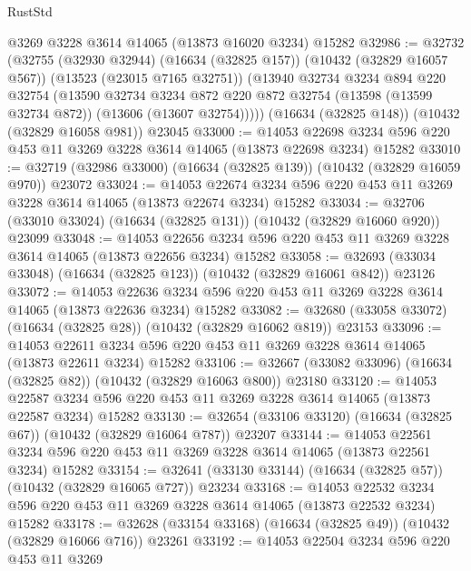\begin{lexlean}{RustStd}
\begin{coremodule}
    @3269
    @3228
    @3614
    @14065
    (@13873 @16020 @3234)
    @15282
@32986 := @32732
    (@32755
      (@32930 @32944)
      (@16634 (@32825 @157))
      (@10432 (@32829 @16057 @567))
      (@13523 (@23015 @7165 @32751))
      (@13940
        @32734
        @3234
        @894
        @220
        @32754
        (@13590
          @32734
          @3234
          @872
          @220
          @872
          @32754
          (@13598 (@13599 @32734 @872))
          (@13606 (@13607 @32754)))))
    (@16634 (@32825 @148))
    (@10432 (@32829 @16058 @981))
    @23045
@33000 := @14053
    @22698
    @3234
    @596
    @220
    @453
    @11
    @3269
    @3228
    @3614
    @14065
    (@13873 @22698 @3234)
    @15282
@33010 := @32719 (@32986 @33000) (@16634 (@32825 @139)) (@10432 (@32829 @16059 @970)) @23072
@33024 := @14053
    @22674
    @3234
    @596
    @220
    @453
    @11
    @3269
    @3228
    @3614
    @14065
    (@13873 @22674 @3234)
    @15282
@33034 := @32706 (@33010 @33024) (@16634 (@32825 @131)) (@10432 (@32829 @16060 @920)) @23099
@33048 := @14053
    @22656
    @3234
    @596
    @220
    @453
    @11
    @3269
    @3228
    @3614
    @14065
    (@13873 @22656 @3234)
    @15282
@33058 := @32693 (@33034 @33048) (@16634 (@32825 @123)) (@10432 (@32829 @16061 @842)) @23126
@33072 := @14053
    @22636
    @3234
    @596
    @220
    @453
    @11
    @3269
    @3228
    @3614
    @14065
    (@13873 @22636 @3234)
    @15282
@33082 := @32680 (@33058 @33072) (@16634 (@32825 @28)) (@10432 (@32829 @16062 @819)) @23153
@33096 := @14053
    @22611
    @3234
    @596
    @220
    @453
    @11
    @3269
    @3228
    @3614
    @14065
    (@13873 @22611 @3234)
    @15282
@33106 := @32667 (@33082 @33096) (@16634 (@32825 @82)) (@10432 (@32829 @16063 @800)) @23180
@33120 := @14053
    @22587
    @3234
    @596
    @220
    @453
    @11
    @3269
    @3228
    @3614
    @14065
    (@13873 @22587 @3234)
    @15282
@33130 := @32654 (@33106 @33120) (@16634 (@32825 @67)) (@10432 (@32829 @16064 @787)) @23207
@33144 := @14053
    @22561
    @3234
    @596
    @220
    @453
    @11
    @3269
    @3228
    @3614
    @14065
    (@13873 @22561 @3234)
    @15282
@33154 := @32641 (@33130 @33144) (@16634 (@32825 @57)) (@10432 (@32829 @16065 @727)) @23234
@33168 := @14053
    @22532
    @3234
    @596
    @220
    @453
    @11
    @3269
    @3228
    @3614
    @14065
    (@13873 @22532 @3234)
    @15282
@33178 := @32628 (@33154 @33168) (@16634 (@32825 @49)) (@10432 (@32829 @16066 @716)) @23261
@33192 := @14053
    @22504
    @3234
    @596
    @220
    @453
    @11
    @3269

\end{coremodule}
\end{lexlean}
